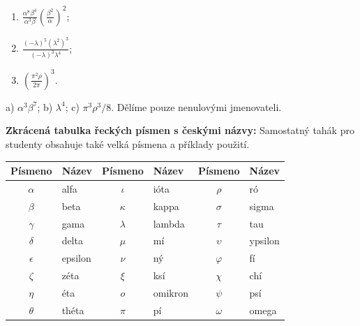 \documentclass[11pt,a4paper]{article}
\begin{document}
\begin{prikladReseniBox}[title={Příklad 4}]
\begin{enumerate}[label=\alph*)]
\item $\frac{\alpha^8\beta^4}{\alpha^3\beta}\left(\frac{\beta^2}{\alpha}\right)^2$;
\item $\frac{(-\lambda)^5(\lambda^2)^3}{(-\lambda)^3\lambda^4}$;
\item $\left(\frac{\pi^2\rho}{2\pi}\right)^3$.
\end{enumerate}
\tcblower
 a) $\boxed{\alpha^3\beta^7}$;
 b) $\boxed{\lambda^4}$;
 c) $\boxed{\pi^3\rho^3/8}$.
Dělíme pouze nenulovými jmenovateli.
\end{prikladReseniBox}
\textbf{Zkrácená tabulka řeckých písmen s českými názvy:}
Samostatný tahák pro studenty obsahuje také velká písmena a příklady použití.
\begin{center}\footnotesize
\begin{tabularx}{\linewidth}{@{}c l c l c X@{}}
\toprule Písmeno & Název & Písmeno & Název & Písmeno & Název \\\midrule
$\alpha$ & alfa & $\iota$ & ióta & $\rho$ & ró \\
$\beta$ & beta & $\kappa$ & kappa & $\sigma$ & sigma \\
$\gamma$ & gama & $\lambda$ & lambda & $\tau$ & tau \\
$\delta$ & delta & $\mu$ & mí & $\upsilon$ & ypsilon \\
$\epsilon$ & epsilon & $\nu$ & ný & $\varphi$ & fí \\
$\zeta$ & zéta & $\xi$ & ksí & $\chi$ & chí \\
$\eta$ & éta & $o$ & omikron & $\psi$ & psí \\
$\theta$ & théta & $\pi$ & pí & $\omega$ & omega \\\bottomrule
\end{tabularx}\end{center}
\end{document}
